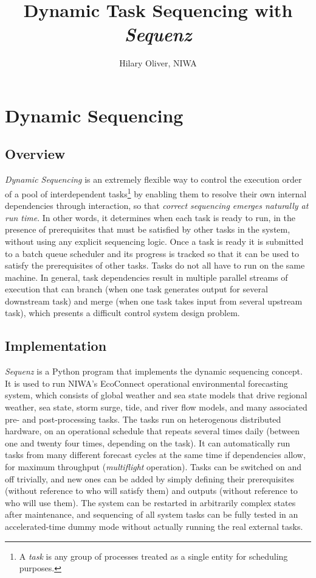 \documentclass[11pt,a4paper]{article}
\title{Dynamic Task Sequencing with {\em Sequenz}}
\author{Hilary Oliver, NIWA}
\begin{document}
\maketitle
\tableofcontents


\section{Dynamic Sequencing}

\subsection{Overview}

{\em Dynamic Sequencing} is an extremely flexible way to control the
execution order of a pool of interdependent tasks\footnote{A {\em task}
is any group of processes treated as a single entity for scheduling
purposes.} by enabling them to resolve their own internal dependencies
through interaction, so that {\em correct sequencing emerges naturally
at run time}. In other words, it determines when each task is ready to
run, in the presence of prerequisites that must be satisfied by other
tasks in the system, without using any explicit sequencing logic. Once a
task is ready it is submitted to a batch queue scheduler and its
progress is tracked so that it can be used to satisfy the prerequisites
of other tasks. Tasks do not all have to run on the same machine.  In
general, task dependencies result in multiple parallel streams of
execution that can branch (when one task generates output for several
downstream task) and merge (when one task takes input from several
upstream task), which presents a difficult control system design
problem.  


\subsection{Implementation}

{\em Sequenz} is a Python program that implements the dynamic sequencing
concept. It is used to run NIWA's EcoConnect operational environmental
forecasting system, which consists of global weather and sea state
models that drive regional weather, sea state, storm surge, tide, and
river flow models, and many associated pre- and post-processing tasks.
The tasks run on heterogenous distributed hardware, on an operational
schedule that repeats several times daily (between one and twenty four
times, depending on the task).  It can automatically run tasks from many
different forecast cycles at the same time if dependencies allow, for
maximum throughput ({\em multiflight} operation). Tasks can be switched
on and off trivially, and new ones can be added by simply defining their
prerequisites (without reference to who will satisfy them) and outputs
(without reference to who will use them). The system can be restarted in
arbitrarily complex states after maintenance, and sequencing of all
system tasks can be fully tested in an accelerated-time dummy mode
without actually running the real external tasks. 
\end{document}
